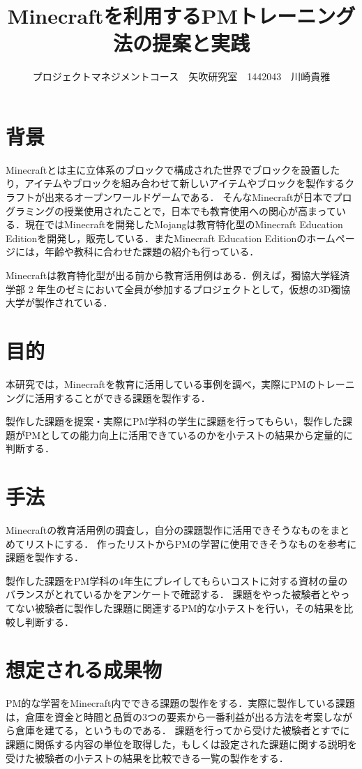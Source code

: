 \documentclass[uplatex,twocolumn,dvipdfmx]{jsarticle}
\title{\vspace{-5mm}\fontsize{14pt}{0pt}\selectfont Minecraftを利用するPMトレーニング法の提案と実践}
\author{\normalsize プロジェクトマネジメントコース　矢吹研究室　1442043　川崎貴雅}
\date{}
\begin{document}
\fontsize{10.5pt}{\baselineskip}\selectfont
\maketitle





\section{背景}

Minecraftとは主に立体系のブロックで構成された世界でブロックを設置したり，アイテムやブロックを組み合わせて新しいアイテムやブロックを製作するクラフトが出来るオープンワールドゲームである．
そんなMinecraftが日本でプログラミングの授業使用されたことで，日本でも教育使用への関心が高まっている．現在ではMinecraftを開発したMojangは教育特化型のMinecraft Education Editionを開発し，販売している．またMinecraft Education Editionのホームページには，年齢や教科に合わせた課題の紹介も行っている\cite{self}．


Minecraftは教育特化型が出る前から教育活用例はある．例えば，獨協大学経済学部 2 年生のゼミにおいて全員が参加するプロジェクトとして，仮想の3D獨協大学が製作されている\cite{ 110009684401}．




\section{目的}
本研究では，Minecraftを教育に活用している事例を調べ，実際にPMのトレーニングに活用することができる課題を製作する．


製作した課題を提案・実際にPM学科の学生に課題を行ってもらい，製作した課題がPMとしての能力向上に活用できているのかを小テストの結果から定量的に判断する．

\section{手法}
Minecraftの教育活用例の調査し，自分の課題製作に活用できそうなものをまとめてリストにする．
作ったリストからPMの学習に使用できそうなものを参考に課題を製作する．

製作した課題をPM学科の4年生にプレイしてもらいコストに対する資材の量のバランスがとれているかをアンケートで確認する．
課題をやった被験者とやってない被験者に製作した課題に関連するPM的な小テストを行い，その結果を比較し判断する．

\section{想定される成果物}
PM的な学習をMinecraft内でできる課題の製作をする．実際に製作している課題は，倉庫を資金と時間と品質の3つの要素から一番利益が出る方法を考案しながら倉庫を建てる，というものである．
課題を行ってから受けた被験者とすでに課題に関係する内容の単位を取得した，もしくは設定された課題に関する説明を受けた被験者の小テストの結果を比較できる一覧の製作をする．
\end{document}
